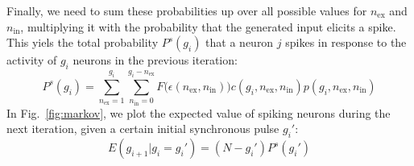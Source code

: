 \documentclass[10pt,a4paper,onecolumn]{article}
\begin{document}
Finally, we need to sum these probabilities up over all possible values for $n_\text{ex}$ and $n_\text{in}$, multiplying it with the probability that the generated input elicits a spike. This yiels the total probability $P^s(g_i)$ that a neuron $j$ spikes in response to the activity of $g_i$ neurons in the previous iteration:
\begin{equation}
P^s(g_i) = \sum_{n_\text{ex}=1}^{g_i}\sum_{n_\text{in}=0}^{g_i-n_\text{ex}} F\big(\epsilon(n_\text{ex}, n_\text{in})\big) c(g_i, n_\text{ex}, n_\text{in}) p(g_i, n_\text{ex}, n_\text{in})
\end{equation}
In Fig.~\ref{fig:markov}, we plot the expected value of spiking neurons during the next iteration, given a certain initial synchronous pulse $g_i'$:
\begin{equation}
E(g_{i+1}|g_i = g_i') = (N - g_i') P^s(g_i')
\end{equation}
\end{document}
